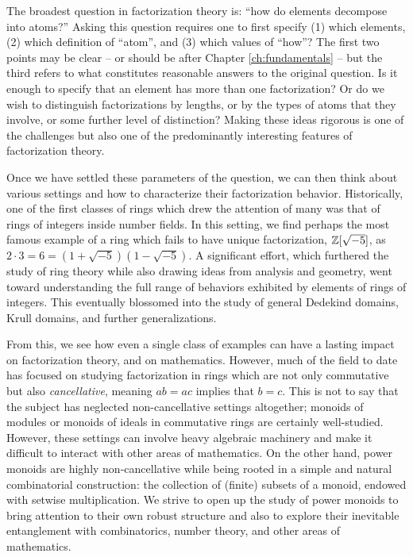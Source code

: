 The broadest question in factorization theory is: ``how do elements decompose into atoms?''
Asking this question requires one to first specify (1) which elements, (2) which definition of ``atom'', and (3) which values of ``how''?
The first two points may be clear -- or should be after Chapter \ref{ch:fundamentals} -- but the third refers to what constitutes reasonable answers to the original question.  
Is it enough to specify that an element has more than one factorization? 
Or do we wish to distinguish factorizations by lengths, or by the types of atoms that they involve, or some further level of distinction?
Making these ideas rigorous is one of the challenges but also one of the predominantly interesting features of factorization theory.  

Once we have settled these parameters of the question, we can then think about various settings and how to characterize their factorization behavior.
Historically, one of the first classes of rings which drew the attention of many was that of rings of integers inside number fields.
In this setting, we find perhaps the most famous example of a ring which fails to have unique factorization, $\mathbb{Z}[\sqrt{-5}]$, as $2\cdot3 = 6 = (1+\sqrt{-5})(1-\sqrt{-5})$.
A significant effort, which furthered the study of ring theory while also drawing ideas from analysis and geometry, went toward understanding the full range of behaviors exhibited by elements of rings of integers.
This eventually blossomed into the study of general Dedekind domains, Krull domains, and further generalizations.  

From this, we see how even a single class of examples can have a lasting impact on factorization theory, and on mathematics.
However, much of the field to date has focused on studying factorization in rings which are not only commutative but also \textit{cancellative}, meaning $ab = ac$ implies that $b=c$.
This is not to say that the subject has neglected non-cancellative settings altogether; monoids of modules or monoids of ideals in commutative rings are certainly well-studied.
However, these settings can involve heavy algebraic machinery and make it difficult to interact with other areas of mathematics.
On the other hand, power monoids are highly non-cancellative while being rooted in a simple and natural combinatorial construction: the collection of (finite) subsets of a monoid, endowed with setwise multiplication.
We strive to open up the study of power monoids to bring attention to their own robust structure and also to explore their inevitable entanglement with combinatorics, number theory, and other areas of mathematics.  

